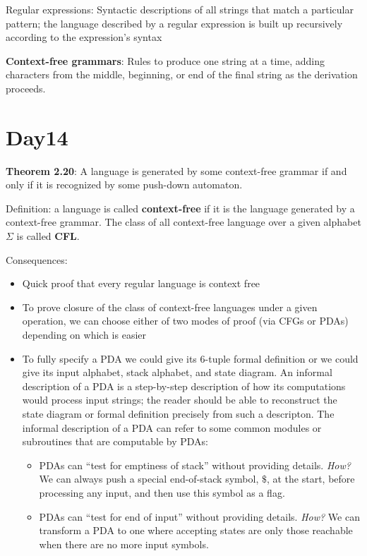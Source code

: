 \documentclass[12pt, oneside]{article}
\begin{document}
Regular expressions: Syntactic descriptions of all strings that match a particular pattern; the language 
described by a regular expression is built up recursively according to the expression's syntax

{\bf Context-free grammars}: Rules to produce one string at a time, adding characters from the middle, beginning, 
or end of the final string as the derivation proceeds.\\

\vfill
 \vfill
\section*{Day14}



{\bf Theorem  2.20}: A language is  generated by some context-free  grammar
if  and only if it is recognized by some push-down automaton.

Definition: a language is called {\bf context-free} if it is the language generated by a context-free grammar.
The class of all context-free language over a given alphabet $\Sigma$ is called {\bf CFL}.

Consequences:
\begin{itemize}
    \item Quick proof that every regular language is context free 
    \item To prove closure of the class of context-free languages under a given operation, we can choose 
    either of two modes 
    of proof (via CFGs or PDAs) depending on which is easier
    \item To fully specify a PDA we could give its $6$-tuple formal definition or we could give its input 
alphabet, stack alphabet, and state diagram.
An informal description of a PDA is a step-by-step description of how its computations 
would process input strings; the reader should be able to reconstruct the state diagram or formal 
definition precisely from such a descripton. The informal description of a PDA can refer to some 
common modules or subroutines that are computable by PDAs:
\begin{itemize}
  \item PDAs can ``test for emptiness of stack'' without providing details. 
  {\it How?} We can always push a special end-of-stack symbol, $\$$, at the start, before processing
  any input, and then use this symbol as a flag.
  \item PDAs can ``test for end of input'' without providing details.
  {\it How?} We can transform a PDA to one where accepting states are only those reachable 
  when there are no more input symbols.
\end{itemize}

\end{itemize}
\end{document}
